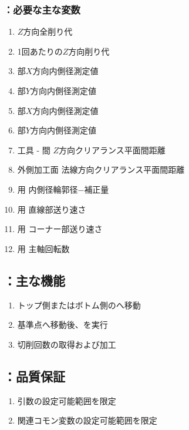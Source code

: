 \subsubsection{\KEndFaceRight：必要な主な変数}
\begin{enumerate}[label*=\sarrow]
\item \EndFacecutMilling$Z$方向全削り代
\item \EndFacecutMilling1回あたりの$Z$方向削り代
\item \TopEndFace 部$X$方向内側径測定値
\item \TopEndFace 部$Y$方向内側径測定値
\item \BottomEndFace 部$X$方向内側径測定値
\item \BottomEndFace 部$Y$方向内側径測定値
\item 工具 - \EndFace 間 $Z$方向クリアランス平面間距離
\item 外側加工面 法線方向クリアランス平面間距離
\item \EndFacecutMilling 用 内側径輪郭径$-$補正量
\item \EndFacecutMilling 用 直線部送り速さ
\item \EndFacecutMilling 用 コーナー部送り速さ
\item \EndFacecutMilling 用 主軸回転数
\end{enumerate}


\subsection{\KEndFaceRight：主な機能}
\begin{enumerate}[label*=\sarrow]
\item トップ側またはボトム側の\EndFacecutMillingReferencePoint へ移動
\item 基準点へ移動後、\KOLeftFS を実行
\item 切削回数の取得および加工
\end{enumerate}


\subsection{\KEndFaceRight：品質保証}
\begin{enumerate}[label*=\sarrow]
\item {}引数の設定可能範囲を限定
\item 関連コモン変数の設定可能範囲を限定
\end{enumerate}



